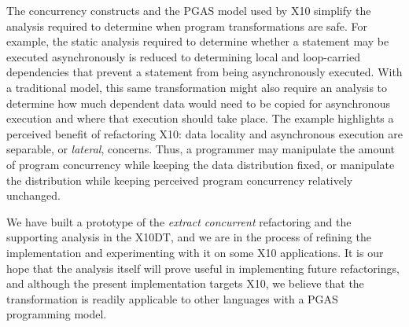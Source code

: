 The concurrency
constructs and the PGAS model used by X10 simplify the analysis required to determine
when program transformations are safe. For example, the static analysis required to
determine whether a statement may be executed asynchronously is
reduced to determining local and loop-carried dependencies that prevent a
statement from being asynchronously executed. With a traditional model, this
same transformation might also require an analysis to determine how much
dependent data would need to be copied for asynchronous execution and
where that execution should take place. The example highlights a perceived benefit of
refactoring X10: data locality and asynchronous execution are separable, or
{\em lateral}, concerns. Thus, a programmer may manipulate the amount of program
concurrency while keeping the data distribution fixed, or manipulate the
distribution while keeping perceived program concurrency relatively unchanged.


We have built a prototype of the {\em extract concurrent} 
refactoring and the supporting analysis
in the X10DT, and we are in the process of refining the
implementation and experimenting with it on some X10 applications. 
It is our hope that 
the analysis itself will prove useful in implementing future refactorings,
and although the present implementation targets X10, we believe that the
transformation is readily applicable to other languages with a PGAS
programming model.
